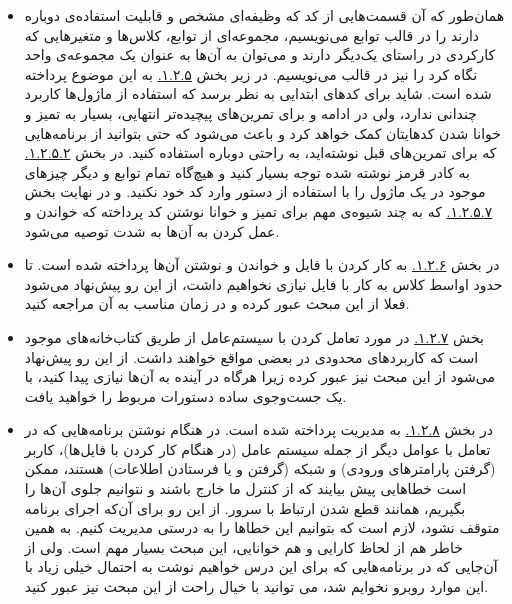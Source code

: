 \documentclass[11pt, a4paper]{article}
\newcommand{\code}[1]{\colorbox{codegray}{\lstinline{#1}}}
\begin{document}
\begin{itemize}[label=\Large $\bullet$]
  \item
  همان‌طور که آن قسمت‌هایی از کد که وظیفه‌ای مشخص و قابلیت استفاده‌ی دوباره دارند را در قالب توابع می‌نویسیم،
  مجموعه‌ای از توابع، کلاس‌ها و متغیرهایی که کارکردی در راستای یک‌دیگر دارند
  و می‌توان به آن‌ها به عنوان یک مجموعه‌ی واحد نگاه کرد را نیز در قالب
  می‌نویسیم.
  در زیر بخش
  \href{https://scipy-lectures.org/intro/language/reusing_code.html}{۱.۲.۵.}
  به این موضوع پرداخته شده است.
  شاید برای کد‌های ابتدایی به نظر برسد که استفاده از ماژول‌ها کاربرد چندانی ندارد،
  ولی در ادامه و برای تمرین‌های پیچیده‌تر انتهایی،
  بسیار به تمیز و خوانا شدن کد‌هایتان کمک خواهد کرد
  و باعث می‌شود که حتی بتوانید از برنامه‌هایی که برای تمرین‌های قبل نوشته‌اید،
  به راحتی دوباره استفاده کنید.
  در بخش
  \href{https://scipy-lectures.org/intro/language/reusing_code.html#importing-objects-from-modules}{۱.۲.۵.۲.}
  به کادر قرمز نوشته شده توجه بسیار کنید و هیچ‌گاه تمام توابع و دیگر‌ چیز‌های موجود در یک ماژول را با استفاده از دستور
  \lr{\code{from [module name] import *}}
  وارد کد خود نکنید.
  و در نهایت بخش
  \href{https://scipy-lectures.org/intro/language/reusing_code.html#good-practices}{۱.۲.۵.۷.}
  که به چند شیوه‌ی مهم برای تمیز و خوانا نوشتن کد پرداخته که خواندن و عمل کردن به‌ آن‌ها به شدت توصیه می‌شود.

  \item
  در بخش
  \href{https://scipy-lectures.org/intro/language/io.html}{۱.۲.۶.}
  به کار کردن با فایل و خواندن و نوشتن آن‌ها پرداخته شده است.
  تا حدود اواسط کلاس به کار با فایل نیازی نخواهیم داشت،
  از این رو پیش‌نهاد می‌شود فعلا از این مبحث عبور کرده و در زمان مناسب به آن مراجعه کنید.

  \item
  بخش
  \href{https://scipy-lectures.org/intro/language/standard_library.html}{۱.۲.۷.}
  در مورد تعامل کردن با سیستم‌عامل از طریق کتاب‌خانه‌‌های موجود است که کاربردهای محدودی در بعضی مواقع خواهند داشت.
  از این رو پیش‌نهاد می‌شود از این مبحث نیز عبور کرده
  زیرا هرگاه در آینده به آن‌ها نیازی پیدا کنید، با یک جست‌وجو‌ی ساده دستورات مربوط را خواهید یافت.

  \item
  در بخش
  \href{https://scipy-lectures.org/intro/language/exceptions.html}{۱.۲.۸.}
  به مدیریت
  پرداخته شده است.
  در هنگام نوشتن برنامه‌هایی که در تعامل با عوامل دیگر از جمله سیستم عامل (در هنگام کار کردن با فایل‌ها)،
  کاربر (گرفتن پارامتر‌های ورودی)
  و شبکه (گرفتن و یا فرستادن اطلاعات)
  هستند،
  ممکن است خطاهایی پیش بیایند که از کنترل ما خارج باشند و نتوانیم جلوی آن‌ها را بگیریم،
  همانند قطع شدن ارتباط با سرور.
  از این رو برای آن‌که اجرای برنامه متوقف نشود،
  لازم است که بتوانیم این خطاها را به درستی مدیریت کنیم.
  به همین خاطر هم از لحاظ کارایی و هم خوانایی،
  این مبحث بسیار مهم است.
  ولی از آن‌جایی که در برنامه‌هایی که برای این درس خواهیم نوشت به احتمال خیلی زیاد با این موارد روبرو نخوایم شد،
  می توانید با خیال راحت از این مبحث نیز عبور کنید.


\end{itemize}
\end{document}
